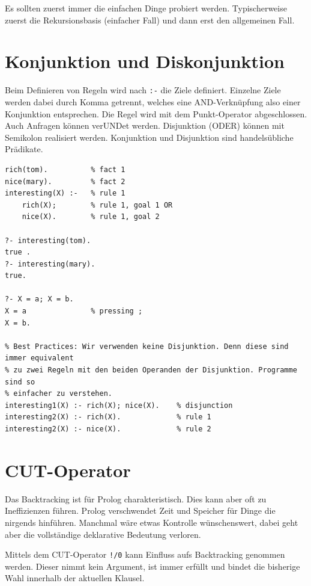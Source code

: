 Es sollten zuerst immer die einfachen Dinge probiert werden. Typischerweise zuerst die Rekursionsbasis (einfacher Fall) und dann erst den allgemeinen Fall. 

\section{Konjunktion und Diskonjunktion}
Beim Definieren von Regeln wird nach \verb|:-| die Ziele definiert. Einzelne Ziele werden dabei durch Komma getrennt, welches eine AND-Verknüpfung also einer Konjunktion entsprechen. Die Regel wird mit dem Punkt-Operator abgeschlossen. Auch Anfragen können verUNDet werden. Disjunktion (ODER) können mit Semikolon realisiert werden. Konjunktion und Disjunktion sind handelsübliche Prädikate. 

\begin{lstlisting}[caption=Disjunktion]
rich(tom). 			% fact 1
nice(mary). 		% fact 2
interesting(X) :- 	% rule 1
	rich(X); 		% rule 1, goal 1 OR
	nice(X).		% rule 1, goal 2

?- interesting(tom).
true .
?- interesting(mary).
true.

?- X = a; X = b.
X = a 				% pressing ;
X = b.

% Best Practices: Wir verwenden keine Disjunktion. Denn diese sind immer equivalent 
% zu zwei Regeln mit den beiden Operanden der Disjunktion. Programme sind so 
% einfacher zu verstehen.
interesting1(X) :- rich(X); nice(X). 	% disjunction
interesting2(X) :- rich(X). 			% rule 1
interesting2(X) :- nice(X). 			% rule 2
\end{lstlisting}

\newpage

\section{CUT-Operator}

Das Backtracking ist für Prolog charakteristisch. Dies kann aber oft zu Ineffizienzen führen. Prolog verschwendet Zeit und Speicher für Dinge die nirgends hinführen. Manchmal wäre etwas Kontrolle wünschenswert, dabei geht aber die vollständige deklarative Bedeutung verloren.

Mittels dem CUT-Operator \verb|!/0| kann Einfluss aufs Backtracking genommen werden. Dieser nimmt kein Argument, ist immer erfüllt und bindet die bisherige Wahl innerhalb der aktuellen Klausel.

